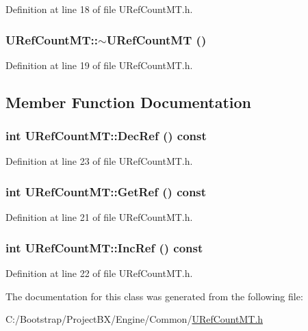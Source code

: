 Definition at line 18 of file URefCountMT.h.\hypertarget{class_u_ref_count_m_t_5665b1a7bd2ea47b997741ab1f4f5cc2}{
\subsubsection[{$\sim$URefCountMT}]{\setlength{\rightskip}{0pt plus 5cm}URefCountMT::$\sim$URefCountMT ()}}
\label{class_u_ref_count_m_t_5665b1a7bd2ea47b997741ab1f4f5cc2}




Definition at line 19 of file URefCountMT.h.

\subsection{Member Function Documentation}
\hypertarget{class_u_ref_count_m_t_1a9d20fb2bb9d7066f6ca79f00dde9a3}{
\subsubsection[{DecRef}]{\setlength{\rightskip}{0pt plus 5cm}int URefCountMT::DecRef () const}}
\label{class_u_ref_count_m_t_1a9d20fb2bb9d7066f6ca79f00dde9a3}




Definition at line 23 of file URefCountMT.h.\hypertarget{class_u_ref_count_m_t_6333c7b0d85515845f21b40bd80439c3}{
\subsubsection[{GetRef}]{\setlength{\rightskip}{0pt plus 5cm}int URefCountMT::GetRef () const}}
\label{class_u_ref_count_m_t_6333c7b0d85515845f21b40bd80439c3}




Definition at line 21 of file URefCountMT.h.\hypertarget{class_u_ref_count_m_t_6af6b14c67a941e1c337ae6fc6a85b13}{
\subsubsection[{IncRef}]{\setlength{\rightskip}{0pt plus 5cm}int URefCountMT::IncRef () const}}
\label{class_u_ref_count_m_t_6af6b14c67a941e1c337ae6fc6a85b13}




Definition at line 22 of file URefCountMT.h.

The documentation for this class was generated from the following file:\begin{CompactItemize}
\item 
C:/Bootstrap/ProjectBX/Engine/Common/\hyperlink{_u_ref_count_m_t_8h}{URefCountMT.h}\end{CompactItemize}
